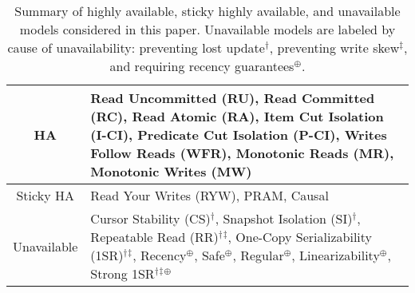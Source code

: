  \newcommand{\lostupdate}{$^\dagger$}
 \newcommand{\rwskew}{$^\ddagger$}
 \newcommand{\linearizable}{$^\oplus$}

\begin{table}[t!]
\begin{tabular}{| c | p{6cm} | }\hline
HA & Read Uncommitted (RU), Read Committed (RC), Read
Atomic (RA), Item Cut Isolation (I-CI), Predicate Cut Isolation
(P-CI), Writes Follow Reads (WFR), Monotonic Reads (MR), Monotonic
Writes (MW)\\\hline Sticky HA & Read Your Writes (RYW), PRAM,
Causal\\\hline Unavailable & Cursor Stability (CS)\lostupdate,
Snapshot Isolation (SI)\lostupdate, Repeatable Read
(RR)\lostupdate\rwskew, One-Copy Serializability
(1SR)\lostupdate\rwskew, Recency\linearizable, Safe\linearizable,
Regular\linearizable, Linearizability\linearizable, Strong
1SR\lostupdate\rwskew\linearizable \\\hline
\end{tabular}
\caption{Summary of highly available, sticky highly available, and
  unavailable models considered in this paper. Unavailable models are
  labeled by cause of unavailability: preventing lost
  update\lostupdate, preventing write skew\rwskew, and requiring
  recency guarantees\linearizable.}
\label{table:hatcompared}
\end{table}

